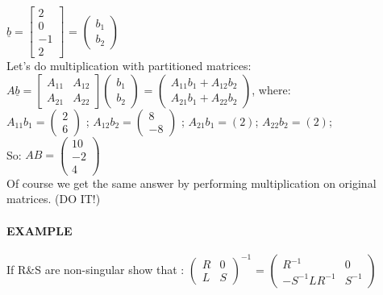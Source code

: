 \documentclass[]{article}
\let\oldparagraph\paragraph
\renewcommand{\paragraph}[1]{\oldparagraph{#1}\mbox{}}
\begin{document}
\(\underline{b}=\left[\begin{array}{c|c} 2 \\ 0 \\ \hline -1 \\ 2 \end{array}\right]\)
= \(\begin{pmatrix} b_1 \\ b_2\end{pmatrix}\)\\

Let's do multiplication with partitioned matrices:\\

\(A\underline{b}=\left[\begin{array}{c|c}A_{11} & A_{12} \\ \hline A_{21} & A_{22} \end{array} \right]\begin{pmatrix} b_1 \\ b_2\end{pmatrix}\)
=
\(\begin{pmatrix} A_{11}b_1 + A_{12}b_2\\ A_{21}b_1 + A_{22}b_2\end{pmatrix}\),
where:\\

\(A_{11}b_1=\begin{pmatrix} 2 \\ 6\end{pmatrix}\) ;
\(A_{12}b_2=\begin{pmatrix} 8 \\ -8\end{pmatrix}\) ; \(A_{21}b_1=(2)\);
\(A_{22}b_2=(2)\);\\
 So: \(AB = \begin{pmatrix} 10 \\ -2 \\ 4\end{pmatrix}\)\\
 Of course we get the same answer by performing multiplication on
original matrices. (DO IT!)\\

\paragraph{\texorpdfstring{EXAMPLE\\
}{EXAMPLE }}\label{example-4}

If R\&S are non-singular show that :
\(\begin{pmatrix} R & 0 \\ L & S\end{pmatrix}^{-1}\) =
\(\begin{pmatrix} R^{-1} & 0 \\ -S^{-1}LR^{-1} & S^{-1}\end{pmatrix}\)\\
\end{document}
